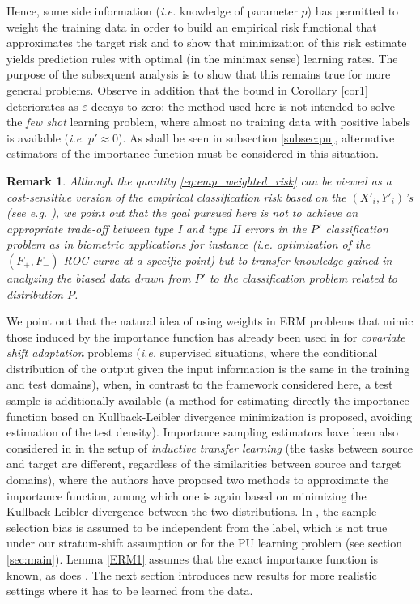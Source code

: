\documentclass[12pt]{article}
\newtheorem{remark}{{\bf Remark}}
\begin{document}
Hence, some side information (\textit{i.e.} knowledge of parameter $p$) has permitted to weight the training data in order to build an empirical risk functional that approximates the target risk and to show that minimization of this risk estimate yields prediction rules with optimal (in the minimax sense) learning rates. The purpose of the subsequent analysis is to show that this remains true for more general problems. Observe in addition that the bound in Corollary \ref{cor1} deteriorates as $\varepsilon$ decays to zero: the method used here is not intended to solve the \textit{few shot} learning problem, where almost no training data with positive labels is available (\textit{i.e.} $p'\approx 0$). As shall be seen in subsection \ref{subsec:pu}, alternative estimators of the importance function must be considered in this situation.
\begin{remark}
Although the quantity \eqref{eq:emp_weighted_risk} can be viewed as a \textit{cost-sensitive} version of the empirical classification risk based on the $(X'_i,Y'_i)$'s (see \textit{e.g.} \cite{BHH06}), we point out that the goal pursued here is not  to achieve an appropriate trade-off between type I and type II errors in the $P'$ classification problem as in biometric applications for instance (\textit{i.e.} optimization of the $(F_+,F_-)$-{\sc ROC} curve at a specific point) but to transfer knowledge gained in analyzing the biased data drawn from $P'$ to the classification problem related to distribution $P$.
\end{remark}

 We point out that the natural idea of using weights in ERM problems that mimic those induced by the importance function has already been used in \cite{sugiyama2008direct} for \textit{covariate shift adaptation} problems (\textit{i.e.} supervised situations, where the conditional distribution of the output given the input information is the same in the training and test domains), when, in contrast to the framework considered here, a test sample is additionally available (a method for estimating directly the importance function based on Kullback-Leibler divergence minimization is proposed, avoiding estimation of the test density).
Importance sampling estimators have been also considered in \cite{garcke2014importance} in the setup of \textit{inductive transfer learning} (the tasks between source and target are different, regardless of the
similarities between source and target domains), where the authors have proposed two methods to approximate the importance function, among which one is again based on minimizing the Kullback-Leibler divergence between the two distributions.
In \cite{cortes2008sample}, the sample selection bias is assumed to be independent from the label, which is not true under our stratum-shift assumption or for the PU learning problem (see section \ref{sec:main}).
Lemma \ref{ERM1} assumes that the exact importance function is known, as does \cite{cortes2010learning}. The next section introduces new results for more realistic settings where it has to be learned from the data.
\end{document}
